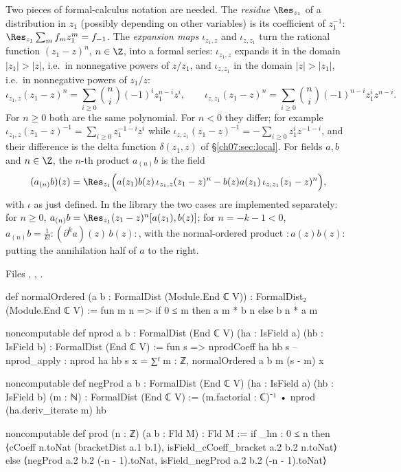 Two pieces of formal-calculus notation are needed. The \emph{residue} $\Res_{z_1}$ of a
distribution in $z_1$ (possibly depending on other variables) is its coefficient of $z_1^{-1}$:
$\Res_{z_1}\sum_m f_m z_1^m = f_{-1}$. The \emph{expansion maps} $\iota_{z_1,z}$ and
$\iota_{z,z_1}$ turn the rational function $(z_1-z)^n$, $n\in\Z$, into a formal series:
$\iota_{z_1,z}$ expands it in the domain $|z_1|>|z|$, i.e.\ in nonnegative powers of $z/z_1$,
and $\iota_{z,z_1}$ in the domain $|z|>|z_1|$, i.e.\ in nonnegative powers of $z_1/z$:
\begin{equation*}
  \iota_{z_1,z}(z_1-z)^n = \sum_{i\ge0}\binom ni(-1)^iz_1^{n-i}z^i,\qquad
  \iota_{z,z_1}(z_1-z)^n = \sum_{i\ge0}\binom ni(-1)^{n-i}z_1^{i}z^{n-i}.
\end{equation*}
For $n\ge0$ both are the same polynomial. For $n<0$ they differ; for example
$\iota_{z_1,z}(z_1-z)^{-1} = \sum_{i\ge0}z_1^{-1-i}z^i$ while
$\iota_{z,z_1}(z_1-z)^{-1} = -\sum_{i\ge0}z_1^iz^{-1-i}$, and their difference is the delta
function $\delta(z_1,z)$ of \S\ref{ch07:sec:local}. For fields $a, b$ and $n\in\Z$, the $n$-th
product $a_{(n)}b$ is the field
\begin{equation}\label{ch07:eq:prod}
  (a_{(n)}b)(z) = \Res_{z_1}\Bigl( a(z_1)b(z)\,\iota_{z_1,z}(z_1-z)^n - b(z)a(z_1)\,
  \iota_{z,z_1}(z_1-z)^n\Bigr),
\end{equation}
with $\iota$ as just defined. In the library the two cases are
implemented separately: for $n\ge 0$, $a_{(n)}b = \Res_{z_1}(z_1-z)^n[a(z_1),b(z)]$; for
$n = -k-1<0$, $a_{(n)}b = \frac1{k!}{:}(\partial^k a)(z)\,b(z){:}$, with the normal-ordered
product ${:}a(z)b(z){:}$ putting the annihilation half of $a$ to the right.

\noindent Files , , .
\begin{leancode}
def normalOrdered (a b : FormalDist (Module.End ℂ V)) : FormalDist₂ (Module.End ℂ V) :=
  fun m n => if 0 ≤ m then a m * b n else b n * a m

noncomputable def nprod {a b : FormalDist (End ℂ V)}
    (ha : IsField a) (hb : IsField b) : FormalDist (End ℂ V) :=
  fun s => nprodCoeff ha hb s
-- nprod_apply : nprod ha hb s x = ∑ᶠ m : ℤ, normalOrdered a b m (s - m) x

noncomputable def negProd {a b : FormalDist (End ℂ V)} (ha : IsField a) (hb : IsField b)
    (m : ℕ) : FormalDist (End ℂ V) :=
  (m.factorial : ℂ)⁻¹ • nprod (ha.deriv_iterate m) hb

noncomputable def prod (n : ℤ) (a b : Fld M) : Fld M :=
  if _hn : 0 ≤ n then
    ⟨cCoeff n.toNat (bracketDist a.1 b.1), isField_cCoeff_bracket a.2 b.2 n.toNat⟩
  else
    ⟨negProd a.2 b.2 (-n - 1).toNat, isField_negProd a.2 b.2 (-n - 1).toNat⟩
\end{leancode}

